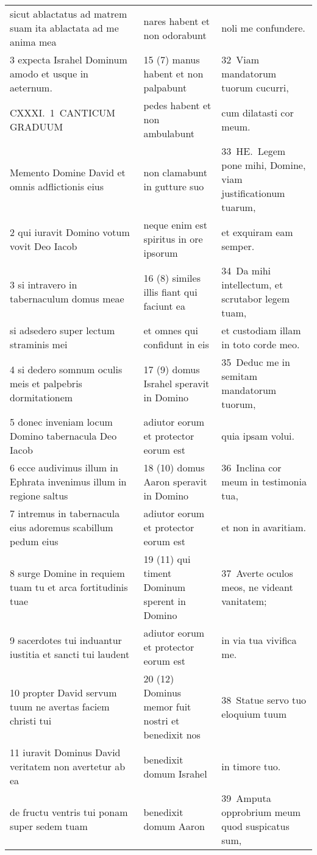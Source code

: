 \documentclass{article}
\begin{document}
\begin{longtable}{@{}p{}p{}p{}@{}}
sicut ablactatus ad matrem suam ita ablactata ad me anima mea	&	nares habent et non odorabunt	&	noli me confundere.	\\
3 expecta Israhel Dominum amodo et usque in aeternum.	&	15 (7) manus habent et non palpabunt	&	32 Viam mandatorum tuorum cucurri,	\\
CXXXI. 1 CANTICUM GRADUUM	&	pedes habent et non ambulabunt	&	cum dilatasti cor meum.	\\
Memento Domine David et omnis adflictionis eius	&	non clamabunt in gutture suo	&	33 HE. Legem pone mihi, Domine, viam justificationum tuarum,	\\
2 qui iuravit Domino votum vovit Deo Iacob	&	neque enim est spiritus in ore ipsorum	&	et exquiram eam semper.	\\
3 si intravero in tabernaculum domus meae	&	16 (8) similes illis fiant qui faciunt ea	&	34 Da mihi intellectum, et scrutabor legem tuam,	\\
si adsedero super lectum straminis mei	&	et omnes qui confidunt in eis	&	et custodiam illam in toto corde meo.	\\
4 si dedero somnum oculis meis et palpebris dormitationem	&	17 (9) domus Israhel speravit in Domino	&	35 Deduc me in semitam mandatorum tuorum,	\\
5 donec inveniam locum Domino tabernacula Deo Iacob	&	adiutor eorum et protector eorum est	&	quia ipsam volui.	\\
6 ecce audivimus illum in Ephrata invenimus illum in regione saltus	&	18 (10) domus Aaron speravit in Domino	&	36 Inclina cor meum in testimonia tua,	\\
7 intremus in tabernacula eius adoremus scabillum pedum eius	&	adiutor eorum et protector eorum est	&	et non in avaritiam.	\\
8 surge Domine in requiem tuam tu et arca fortitudinis tuae	&	19 (11) qui timent Dominum sperent in Domino	&	37 Averte oculos meos, ne videant vanitatem;	\\
9 sacerdotes tui induantur iustitia et sancti tui laudent	&	adiutor eorum et protector eorum est	&	in via tua vivifica me.	\\
10 propter David servum tuum ne avertas faciem christi tui	&	20 (12) Dominus memor fuit nostri et benedixit nos	&	38 Statue servo tuo eloquium tuum	\\
11 iuravit Dominus David veritatem non avertetur ab ea	&	benedixit domum Israhel	&	in timore tuo.	\\
de fructu ventris tui ponam super sedem tuam	&	benedixit domum Aaron	&	39 Amputa opprobrium meum quod suspicatus sum,	\\

\end{longtable}
\end{document}
